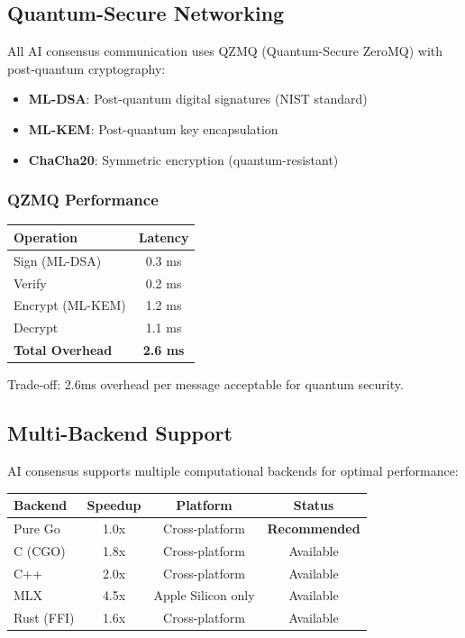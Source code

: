 \subsection{Quantum-Secure Networking}

All AI consensus communication uses QZMQ (Quantum-Secure ZeroMQ) with post-quantum cryptography:

\begin{itemize}
\item \textbf{ML-DSA}: Post-quantum digital signatures (NIST standard)
\item \textbf{ML-KEM}: Post-quantum key encapsulation
\item \textbf{ChaCha20}: Symmetric encryption (quantum-resistant)
\end{itemize}

\subsubsection{QZMQ Performance}

\begin{center}
\begin{tabular}{lc}
\toprule
\textbf{Operation} & \textbf{Latency} \\
\midrule
Sign (ML-DSA) & 0.3 ms \\
Verify & 0.2 ms \\
Encrypt (ML-KEM) & 1.2 ms \\
Decrypt & 1.1 ms \\
\midrule
\textbf{Total Overhead} & \textbf{2.6 ms} \\
\bottomrule
\end{tabular}
\end{center}

Trade-off: 2.6ms overhead per message acceptable for quantum security.

\subsection{Multi-Backend Support}

AI consensus supports multiple computational backends for optimal performance:

\begin{center}
\begin{tabular}{lccc}
\toprule
\textbf{Backend} & \textbf{Speedup} & \textbf{Platform} & \textbf{Status} \\
\midrule
Pure Go & 1.0x & Cross-platform & \textbf{Recommended} \\
C (CGO) & 1.8x & Cross-platform & Available \\
C++ & 2.0x & Cross-platform & Available \\
MLX & 4.5x & Apple Silicon only & Available \\
Rust (FFI) & 1.6x & Cross-platform & Available \\
\bottomrule
\end{tabular}
\end{center}

